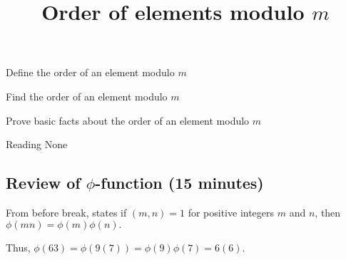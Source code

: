 \documentclass{../ximera}
\title{Order of elements modulo $m$}
\begin{document}
\begin{abstract}
\end{abstract}
\maketitle


\begin{obj}
\item Define the order of an element modulo $m$
\item Find the order of an element modulo $m$
\item Prove basic facts about the order of an element modulo $m$
\end{obj}


\begin{pre}
    \item[Reading] None
\end{pre}

\subsection{Review of $\phi$-function (15 minutes)}

\begin{remark}
    From before break,  states if $(m,n)=1$ for positive integers $m$ and $n$, then $\phi(mn)=\phi(m)\phi(n).$ 

    Thus, $\phi(63)=\phi(9(7))=\phi(9)\phi(7)=6(6).$
\end{remark}
\end{document}
